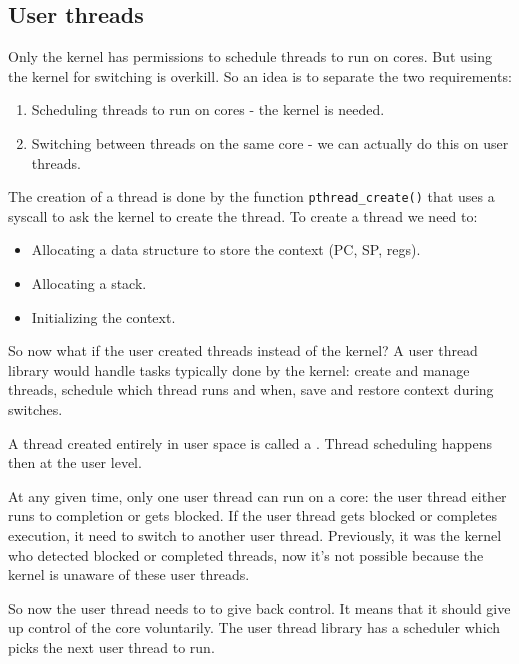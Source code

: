     \subsection{User threads}
    Only the kernel has permissions to schedule threads to run on cores. But using the kernel for switching is overkill. So an idea is to separate the two requirements:
    \begin{enumerate}[left=10pt]
        \item Scheduling threads to run on cores - the kernel is needed. 
        \item Switching between threads on the same core - we can actually do this on user threads.
    \end{enumerate}
    \begin{tcolorbox}[violet]
    The creation of a thread is done by the function \lstinline!pthread_create()! that uses a syscall to ask the kernel to create the thread. To create a thread we need to:
    \begin{itemize}[left=10pt, label=\textbullet]
        \item Allocating a data structure to store the context (PC, SP, regs).
        \item Allocating a stack.
        \item Initializing the context.
    \end{itemize}
    \end{tcolorbox}
    So now what if the user created threads instead of the kernel? A user thread library would handle tasks typically done by the kernel: create and manage threads, schedule which thread runs and when, save and restore context during switches.
    \begin{tcolorbox}[vert]
        A thread created entirely in user space is called a . Thread scheduling happens then at the user level.
    \end{tcolorbox}
    At any given time, only one user thread can run on a core: the user thread either runs to completion or gets blocked. If the user thread gets blocked or completes execution, it need to switch to another user thread. Previously, it was the kernel who detected blocked or completed threads, now it's not possible because the kernel is unaware of these user threads. 
    \begin{tcolorbox}[vert]
        So now the user thread needs to  to give back control. It means that it should give up control of the core voluntarily. The user thread library has a scheduler which picks the next user thread to run.
    \end{tcolorbox}
